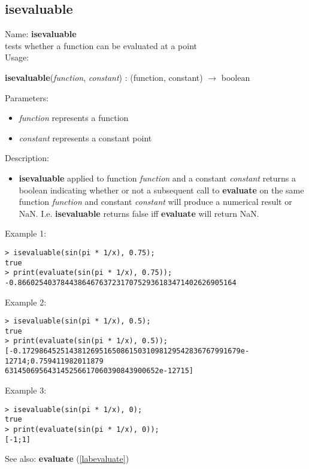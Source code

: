 \subsection{isevaluable}
\label{labisevaluable}
\noindent Name: \textbf{isevaluable}\\
tests whether a function can be evaluated at a point \\

\noindent Usage: 
\begin{center}
\textbf{isevaluable}(\emph{function}, \emph{constant}) : (\textsf{function}, \textsf{constant}) $\rightarrow$ \textsf{boolean}\\
\end{center}
Parameters: 
\begin{itemize}
\item \emph{function} represents a function
\item \emph{constant} represents a constant point
\end{itemize}
\noindent Description: \begin{itemize}

\item \textbf{isevaluable} applied to function \emph{function} and a constant \emph{constant} returns
   a boolean indicating whether or not a subsequent call to \textbf{evaluate} on the
   same function \emph{function} and constant \emph{constant} will produce a numerical
   result or NaN. I.e. \textbf{isevaluable} returns false iff \textbf{evaluate} will return NaN.
\end{itemize}
\noindent Example 1: 
\begin{center}\begin{minipage}{15cm}\begin{Verbatim}[frame=single]
> isevaluable(sin(pi * 1/x), 0.75);
true
> print(evaluate(sin(pi * 1/x), 0.75));
-0.866025403784438646763723170752936183471402626905164
\end{Verbatim}
\end{minipage}\end{center}
\noindent Example 2: 
\begin{center}\begin{minipage}{15cm}\begin{Verbatim}[frame=single]
> isevaluable(sin(pi * 1/x), 0.5);
true
> print(evaluate(sin(pi * 1/x), 0.5));
[-0.172986452514381269516508615031098129542836767991679e-12714;0.759411982011879
631450695643145256617060390843900652e-12715]
\end{Verbatim}
\end{minipage}\end{center}
\noindent Example 3: 
\begin{center}\begin{minipage}{15cm}\begin{Verbatim}[frame=single]
> isevaluable(sin(pi * 1/x), 0);
true
> print(evaluate(sin(pi * 1/x), 0));
[-1;1]
\end{Verbatim}
\end{minipage}\end{center}
See also: \textbf{evaluate} (\ref{labevaluate})
